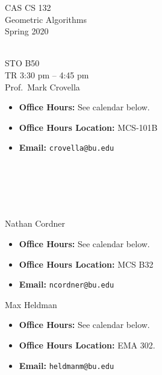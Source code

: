 \documentclass[11pt]{article}
\begin{document}
\sloppy 
\begin{center}
\LARGE CAS CS 132\\
\Large Geometric Algorithms\\
\Large\rm Spring 2020\\~\\
\end{center}

 STO B50\\[\baselineskip]
 TR 3:30 pm -- 4:45 pm 
\\[\baselineskip] 

 Prof.\ Mark Crovella\\[0.75\baselineskip]
\begin{minipage}[t]{0.60\textwidth}
\begin{itemize}
\item {\bf Office Hours:} See calendar below.
\item {\bf Office Hours Location:} MCS-101B 
\item {\bf Email:} \texttt{crovella@bu.edu}
\end{itemize}
\end{minipage}
~\\~\\~\\~\\
 \begin{minipage}[t]{0.60\textwidth}
  Nathan Cordner 
 \begin{itemize}
 \item {\bf Office Hours:} See calendar below.
 \item {\bf Office Hours Location:} MCS B32
 \item {\bf Email:} \texttt{ncordner@bu.edu}
 \end{itemize}
 \end{minipage}
 \begin{minipage}[t]{0.60\textwidth}
  Max Heldman
 \begin{itemize}
 \item {\bf Office Hours:} See calendar below.
 \item {\bf Office Hours Location:} EMA 302.
 \item {\bf Email:} \texttt{heldmanm@bu.edu}
 \end{itemize}
 \end{minipage}
~\\~\\~\\
\end{document}

